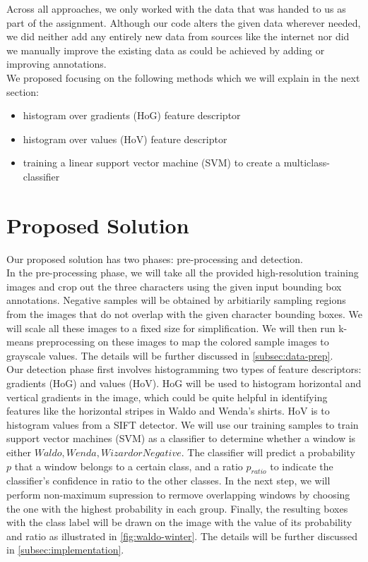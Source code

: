 \documentclass[11pt]{article}
\begin{document}
Across all approaches, we only worked with the data that was handed to us as part of the assignment.
Although our code alters the given data wherever needed, we did neither add any entirely new data from
sources like the internet nor did we manually improve the existing data as could be achieved by adding
or improving annotations.\\

We proposed focusing on the following methods which we will explain in the next section:

\begin{itemize}
    \item histogram over gradients (HoG) feature descriptor
    \item histogram over values (HoV) feature descriptor
    \item training a linear support vector machine (SVM) to create a multiclass-classifier
\end{itemize}

\section{Proposed Solution}
Our proposed solution has two phases: pre-processing and detection.\\

In the pre-processing phase, we will take all the provided high-resolution training images and crop out the three characters using
the given input bounding box annotations. Negative samples will be obtained by arbitiarily sampling
regions from the images that do not overlap with the given character bounding boxes. We will scale
all these images to a fixed size for simplification. We will then run k-means preprocessing on these
images to map the colored sample images to grayscale values. The details will be further discussed in
\autoref{subsec:data-prep}.\\

Our detection phase first involves histogramming two types of feature descriptors: gradients (HoG) and
values (HoV). HoG will be used to histogram horizontal and vertical gradients in the image, which could
be quite helpful in identifying features like the horizontal stripes in Waldo and Wenda's shirts. HoV is
to histogram values from a SIFT detector. We will use our training samples to train support vector
machines (SVM) as a classifier to determine whether a window is either \(Waldo, Wenda, Wizard or Negative\).
The classifier will predict a probability \(p\) that a window belongs to a certain class, and a ratio
\(p_{ratio}\) to indicate the classifier's confidence in ratio to the other classes.
In the next step, we will perform non-maximum supression to rermove overlapping windows by choosing the
one with the highest probability in each group. Finally, the resulting boxes with the class label will
be drawn on the image with the value of its probability and ratio as illustrated in
\autoref{fig:waldo-winter}. The details will be further discussed in \autoref{subsec:implementation}.
\end{document}
